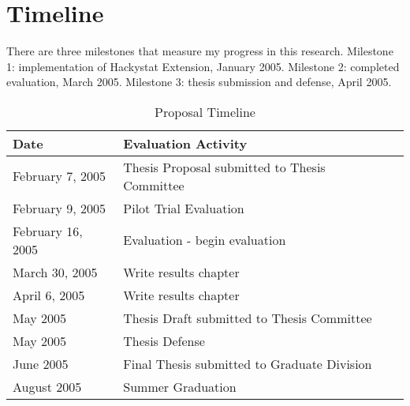 
\chapter{Timeline}
\label{chapter:timeline}
There are three milestones that measure my progress in this research.
Milestone 1: implementation of Hackystat Extension, January 2005.
Milestone 2: completed evaluation, March 2005. Milestone 3: thesis
submission and defense, April 2005.

\begin{table}[htbp]
  \begin{center}
    \caption{Proposal Timeline}
    \begin{tabular}{|l|l|l|} \hline
      {\bf Date} & {\bf Evaluation Activity} \\ \hline

February 7, 2005 & Thesis Proposal submitted to Thesis Committee \\ \hline
February 9, 2005 & Pilot Trial Evaluation \\ \hline
February 16, 2005 & Evaluation - begin evaluation \\ \hline
March 30, 2005 & Write results chapter \\ \hline
April 6, 2005 & Write results chapter \\ \hline
May 2005 & Thesis Draft submitted to Thesis Committee \\ \hline
May 2005 & Thesis Defense \\ \hline
June 2005 & Final Thesis submitted to Graduate Division \\ \hline
August 2005 & Summer Graduation \\ \hline
    \end{tabular}
  \end{center}
\end{table}

